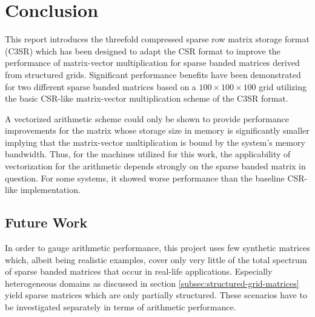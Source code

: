 \chapter*{Conclusion}

  This report introduces the threefold compressed sparse row matrix storage format (C3SR) which has been designed to adapt the CSR format to improve the performance of matrix-vector multiplication for sparse banded matrices derived from structured grids. Significant performance benefits have been demonstrated for two different sparse banded matrices based on a $100 \times 100 \times 100$ grid utilizing the basic CSR-like matrix-vector multiplication scheme of the C3SR format.

  A vectorized arithmetic scheme could only be shown to provide performance improvements for the matrix whose storage size in memory is significantly smaller implying that the matrix-vector multiplication is bound by the system's memory bandwidth. Thus, for the machines utilized for this work, the applicability of vectorization for the arithmetic depends strongly on the sparse banded matrix in question. For some systems, it showed worse performance than the baseline CSR-like implementation.

  \section*{Future Work}

    In order to gauge arithmetic performance, this project uses few synthetic matrices which, albeit being realistic examples, cover only very little of the total spectrum of sparse banded matrices that occur in real-life applications. Especially heterogeneous domains as discussed in section \ref{subsec:structured-grid-matrices} yield sparse matrices which are only partially structured. These scenarios have to be investigated separately in terms of arithmetic performance.

